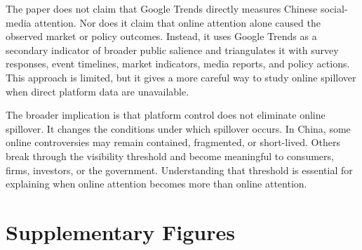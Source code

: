 \documentclass[conference]{IEEEtran}
\begin{document}
The paper does not claim that Google Trends directly measures Chinese social-media attention. Nor does it claim that online attention alone caused the observed market or policy outcomes. Instead, it uses Google Trends as a secondary indicator of broader public salience and triangulates it with survey responses, event timelines, market indicators, media reports, and policy actions. This approach is limited, but it gives a more careful way to study online spillover when direct platform data are unavailable.

The broader implication is that platform control does not eliminate online spillover. It changes the conditions under which spillover occurs. In China, some online controversies may remain contained, fragmented, or short-lived. Others break through the visibility threshold and become meaningful to consumers, firms, investors, or the government. Understanding that threshold is essential for explaining when online attention becomes more than online attention.




\clearpage
\onecolumn
\appendices
\setcounter{figure}{0}
\renewcommand{\thefigure}{A\arabic{figure}}
\section{Supplementary Figures}
\end{document}
